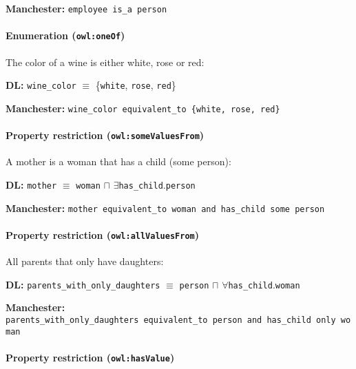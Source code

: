 \documentclass[a4paper,]{report}
\let\oldparagraph\paragraph
\renewcommand{\paragraph}[1]{\oldparagraph{#1}\mbox{}}
\begin{document}
\textbf{Manchester:} \texttt{employee\ is\_a\ person}

\hypertarget{enumeration-owloneof}{%
\paragraph{\texorpdfstring{Enumeration
(\texttt{owl:oneOf})}{Enumeration (owl:oneOf)}}\label{enumeration-owloneof}}

The color of a wine is either white, rose or red:

\textbf{DL:} \texttt{wine\_color} \(\equiv\) \{\texttt{white},
\texttt{rose}, \texttt{red}\}

\textbf{Manchester:}
\texttt{wine\_color\ equivalent\_to\ \{white,\ rose,\ red\}}

\hypertarget{property-restriction-owlsomevaluesfrom}{%
\paragraph{\texorpdfstring{Property restriction
(\texttt{owl:someValuesFrom})}{Property restriction (owl:someValuesFrom)}}\label{property-restriction-owlsomevaluesfrom}}

A mother is a woman that has a child (some person):

\textbf{DL:} \texttt{mother} \(\equiv\) \texttt{woman} \(\sqcap\)
\(\exists\)\texttt{has\_child}.\texttt{person}

\textbf{Manchester:}
\texttt{mother\ equivalent\_to\ woman\ and\ has\_child\ some\ person}

\hypertarget{property-restriction-owlallvaluesfrom}{%
\paragraph{\texorpdfstring{Property restriction
(\texttt{owl:allValuesFrom})}{Property restriction (owl:allValuesFrom)}}\label{property-restriction-owlallvaluesfrom}}

All parents that only have daughters:

\textbf{DL:} \texttt{parents\_with\_only\_daughters} \(\equiv\)
\texttt{person} \(\sqcap\) \(\forall\)\texttt{has\_child}.\texttt{woman}

\textbf{Manchester:}
\texttt{parents\_with\_only\_daughters\ equivalent\_to\ person\ and\ has\_child\ only\ woman}

\hypertarget{property-restriction-owlhasvalue}{%
\paragraph{\texorpdfstring{Property restriction
(\texttt{owl:hasValue})}{Property restriction (owl:hasValue)}}\label{property-restriction-owlhasvalue}}
\end{document}
